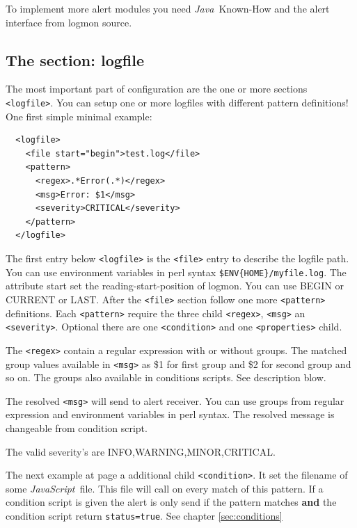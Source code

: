 \documentclass[11pt,a4paper]{article}
\newcommand{\js}{\textit{JavaScript\ }}
\newcommand{\java}{\textit{Java\ }}
\begin{document}
To implement more alert modules you need \java Known-How and the alert interface
from logmon source.

\subsection{The section: logfile}

The most important part of configuration are the one or more sections \verb#<logfile>#. You can  
setup one or more logfiles with different pattern definitions! One first simple minimal example:

\begin{samepage}
\label{ex:logfile1}
\begin{verbatim}
  <logfile>
    <file start="begin">test.log</file>
    <pattern>
      <regex>.*Error(.*)</regex>
      <msg>Error: $1</msg>
      <severity>CRITICAL</severity>
    </pattern>
  </logfile>
\end{verbatim}
\end{samepage}

The first entry below \verb#<logfile># is the \verb#<file># entry to describe
the logfile path. You can use environment variables in perl syntax
\verb#$ENV{HOME}/myfile.log#. The attribute start set the reading-start-position
of logmon. You can use BEGIN or CURRENT or LAST.
After the \verb#<file># section
follow one more \verb#<pattern># definitions. Each \verb#<pattern># require the
three child \verb#<regex>#, \verb#<msg># an \verb#<severity>#. Optional there
are one \verb#<condition># and one \verb#<properties># child.

The \verb#<regex># contain a regular expression with or without groups. The
matched group values available in \verb#<msg># as \$1 for first group and \$2
for second group and so on. The groups also available in conditions scripts. See
description blow.

The resolved \verb#<msg># will send to alert receiver. You can use groups from
regular expression and environment variables in perl syntax. The resolved message
is changeable from condition script.

The valid severity's are INFO,WARNING,MINOR,CRITICAL.

The next example at page \pageref{ex:logfile2} a additional child
\verb#<condition>#. It set the filename of some \js file. This file will
call on every match of this pattern. If a condition script is given the alert
is only send if the pattern matches \textbf{and} the condition script return
\verb#status=true#. See chapter \ref{sec:conditions}
\end{document}
